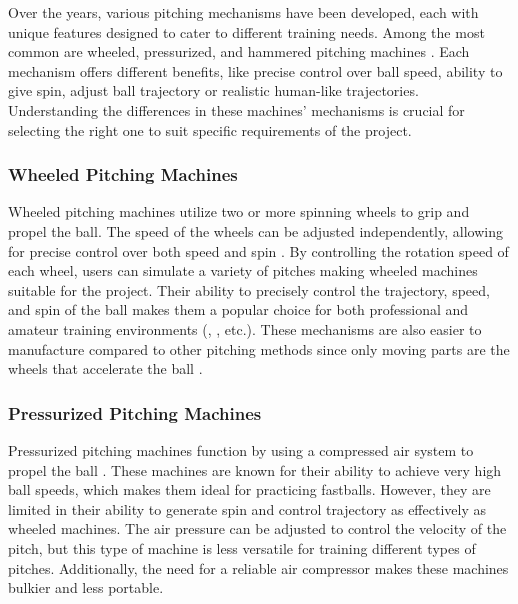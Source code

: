 \documentclass[12pt]{article}
\newenvironment{indentedsection}{
    \setlength{\parindent}{1cm} %
    \setlength{\leftskip}{1cm} %
}{}
\begin{document}
Over the years, various pitching mechanisms have been developed, each with unique features designed to cater to different training needs. Among the most common are wheeled, pressurized, and hammered pitching machines  \cite{Lan2024}. Each mechanism offers different benefits, like precise control over ball speed, ability to give spin, adjust ball trajectory or realistic human-like trajectories. Understanding the differences in these machines’ mechanisms is crucial for selecting the right one to suit specific requirements of the project. 

\begin{indentedsection}

\subsubsection{Wheeled Pitching Machines}

Wheeled pitching machines utilize two or more spinning wheels to grip and propel the ball. The speed of the wheels can be adjusted independently, allowing for precise control over both speed and spin \cite{Dittrich2023}. By controlling the rotation speed of each wheel, users can simulate a variety of pitches making wheeled machines suitable for the project. Their ability to precisely control the trajectory, speed, and spin of the ball makes them a popular choice for both professional and amateur training environments (\cite{zxmoto2022}, \cite{amazon2024}, \cite{ipong2022} etc.). These mechanisms are also easier to manufacture compared to other pitching methods since only moving parts are the wheels that accelerate the ball \cite{Zhang2021}.

\subsubsection{Pressurized Pitching Machines}

Pressurized pitching machines function by using a compressed air system to propel the ball \cite{Wiley1994}. These machines are known for their ability to achieve very high ball speeds, which makes them ideal for practicing fastballs. However, they are limited in their ability to generate spin and control trajectory as effectively as wheeled machines. The air pressure can be adjusted to control the velocity of the pitch, but this type of machine is less versatile for training different types of pitches. Additionally, the need for a reliable air compressor makes these machines bulkier and less portable. 


\end{indentedsection}
\end{document}
